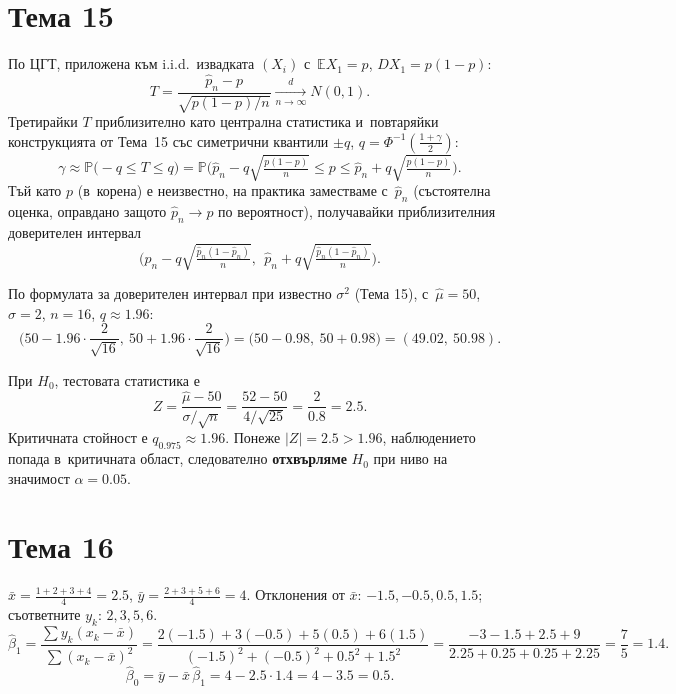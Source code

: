 \section*{Тема 15}

\begin{proofbox}
По ЦГТ, приложена към i.i.d.\ извадката $(X_i)$ с~$\mathbb EX_1=p$,
$DX_1=p(1-p)$:
\[
  T = \frac{\hat p_n-p}{\sqrt{p(1-p)/n}} \xrightarrow[n\to\infty]{d}
  N(0,1).
\]
Третирайки $T$ приблизително като централна статистика и~повтаряйки
конструкцията от Тема~15 със симетрични квантили $\pm q$, $q=
\Phi^{-1}(\tfrac{1+\gamma}2)$:
\[
  \gamma \approx \mathbb P\big(-q\le T\le q\big) = \mathbb P\Big(
  \hat p_n - q\sqrt{\tfrac{p(1-p)}n} \le p \le \hat p_n+q\sqrt{
  \tfrac{p(1-p)}n}\Big).
\]
Тъй като $p$ (в~корена) е неизвестно, на практика заместваме с~$\hat p_n$ (състоятелна оценка, оправдано защото $\hat p_n\to p$ по
вероятност), получавайки приблизителния доверителен интервал
\[
  \Big(\hat p_n - q\sqrt{\tfrac{\hat p_n(1-\hat p_n)}n},\ \ \hat p_n
  + q\sqrt{\tfrac{\hat p_n(1-\hat p_n)}n}\Big).
\]
\end{proofbox}

\begin{proofbox}
По формулата за доверителен интервал при известно $\sigma^2$ (Тема
15), с~$\hat\mu=50$, $\sigma=2$, $n=16$, $q\approx1.96$:
\[
  \Big(50-1.96\cdot\frac2{\sqrt{16}},\ 50+1.96\cdot\frac2{\sqrt{16}}
  \Big) = \big(50-0.98,\ 50+0.98\big) = (49.02,\ 50.98).
\]
\end{proofbox}

\begin{proofbox}
При $H_0$, тестовата статистика е
\[
  Z = \frac{\hat\mu-50}{\sigma/\sqrt n} = \frac{52-50}{4/\sqrt{25}} =
  \frac2{0.8} = 2.5.
\]
Критичната стойност е $q_{0.975}\approx1.96$. Понеже $|Z|=2.5>1.96$,
наблюдението попада в~критичната област, следователно \textbf{
отхвърляме} $H_0$ при ниво на значимост $\alpha=0.05$.
\end{proofbox}

\section*{Тема 16}

\begin{proofbox}
$\bar x = \tfrac{1+2+3+4}4=2.5$, $\bar y=\tfrac{2+3+5+6}4=4$.
Отклонения от $\bar x$: $-1.5,-0.5,0.5,1.5$; съответните $y_k$:
$2,3,5,6$.
\[
  \hat\beta_1 = \frac{\sum y_k(x_k-\bar x)}{\sum(x_k-\bar x)^2} =
  \frac{2(-1.5)+3(-0.5)+5(0.5)+6(1.5)}{(-1.5)^2+(-0.5)^2+0.5^2+1.5^2}
  = \frac{-3-1.5+2.5+9}{2.25+0.25+0.25+2.25} = \frac7{5} = 1.4.
\]
\[
  \hat\beta_0 = \bar y - \bar x\,\hat\beta_1 = 4 - 2.5\cdot1.4 = 4-
  3.5 = 0.5.
\]
\end{proofbox}

